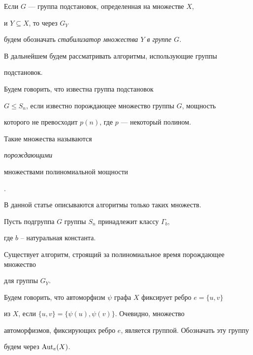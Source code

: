 Если $G$ --- группа подстановок, определенная на множестве $X$,


и $Y\subseteq X$, то через $G_Y$


будем обозначать {\it стабилизатор множества $Y$ в группе $G$}.





В дальнейшем будем рассматривать алгоритмы, использующие группы


подстановок.


Будем говорить, что известна группа подстановок


$G\le S_n$, если известно порождающее множество группы $G$, мощность


которого не превосходит $p(n)$, где $p$ --- некоторый полином.


Такие множества называются {\it порождающими


множествами полиномиальной мощности} \cite{Hoffmann}.


В данной статье описываются алгоритмы только таких множеств.











\begin{props}


\label{Stabilizator}


Пусть подгруппа $G$ группы $S_n$ принадлежит классу $\Gamma_b$,


где $b$ -- натуральная константа.


Существует алгоритм, строящий за полиномиальное время порождающее множество


для группы $G_Y$.


\end{props}





Будем говорить, что автоморфизм $\psi$ графа $X$ фиксирует ребро $e=\{u, v\}$


из $X$, если $\{u, v\}=\{\psi(u), \psi(v)\}$. Очевидно, множество


автоморфизмов, фиксирующих ребро $e$, является группой. Обозначать эту группу


будем через $\operatorname{Aut}_e(X)$.





